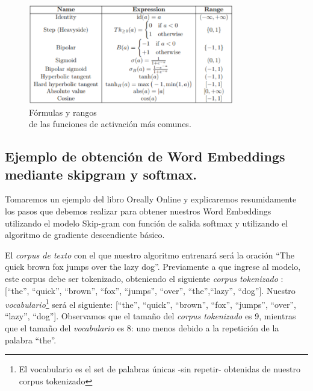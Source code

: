 \documentclass[12pt,a4paper]{article}
\begin{document}
\begin{sloppypar}
\begin{figure}[H]    %
 \centering
 \includegraphics[width=0.8\textwidth]{images/ANN/8-ANN.png}
 \caption[Fórmulas y rangos de las funciones de activación más comunes.]{Fórmulas y rangos\\ de las funciones de activación más comunes\protect\footnotemark \cite{ANN_22}.}
 \label{fig:ann_8}
\end{figure}


\cleardoublepage

\subsection{Ejemplo de obtención de Word Embeddings mediante skipgram y softmax.}\label{anexo_word_emb}

Tomaremos un ejemplo del libro Oreally Online y explicaremos resumidamente los pasos que debemos realizar para obtener nuestros Word Embeddings utilizando el modelo Skip-gram con función de salida softmax y utilizando el algoritmo de gradiente descendiente básico.

El \textit{corpus de texto} con el que nuestro algoritmo entrenará será la oración “The quick brown fox jumps over the lazy dog”. Previamente a que ingrese al modelo, este corpus debe ser tokenizado, obteniendo el siguiente \textit{corpus tokenizado} : [“the”, “quick”, “brown”, “fox”, “jumps”, “over”, “the”,“lazy”, “dog”]. Nuestro \textit{vocabulario}\footnote{El vocabulario es el set de palabras únicas -sin repetir- obtenidas de nuestro corpus tokenizado} será el siguiente: [“the”, “quick”, “brown”, “fox”, “jumps”, “over”, “lazy”, “dog”]. Observamos que el tamaño del \textit{corpus tokenizado} es 9, mientras que el tamaño del \textit{vocabulario} es 8: uno menos debido a la repetición de la palabra “the”. 


\end{sloppypar}
\end{document}
